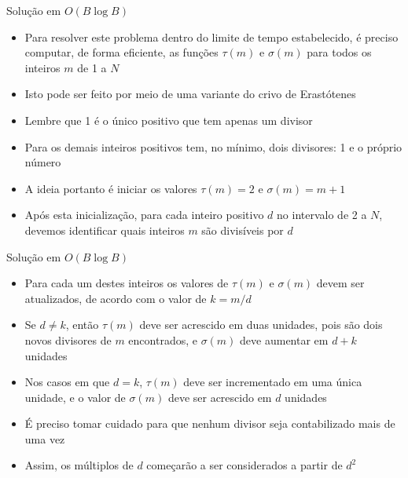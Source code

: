 \begin{frame}[fragile]{Solução em $O(B\log B)$}

    \begin{itemize}
        \item Para resolver este problema dentro do limite de tempo estabelecido, é preciso
            computar, de forma eficiente, as funções $\tau(m)$ e $\sigma(m)$ para todos 
            os inteiros $m$ de 1 a $N$

        \item Isto pode ser feito por meio de uma variante do crivo de Erastótenes

        \item Lembre que 1 é o único positivo que tem apenas um divisor

        \item Para os demais inteiros positivos tem, no mínimo, dois divisores: 1 e o próprio
            número

        \item A ideia portanto é iniciar os valores $\tau(m) = 2$ e $\sigma(m) = m + 1$

        \item Após esta inicialização, para cada inteiro positivo $d$ no intervalo de 2 a $N$,
            devemos identificar quais inteiros $m$ são divisíveis por $d$
    \end{itemize}

\end{frame}

\begin{frame}[fragile]{Solução em $O(B\log B)$}

    \begin{itemize}
        \item Para cada um destes inteiros os valores de $\tau(m)$ e $\sigma(m)$ devem ser 
            atualizados, de acordo com o valor de $k = m/d$

        \item Se $d\neq k$, então $\tau(m)$ deve ser acrescido em duas unidades, pois são
            dois novos divisores de $m$ encontrados, e $\sigma(m)$ deve aumentar em $d + k$
            unidades

        \item Nos casos em que $d = k$, $\tau(m)$ deve ser incrementado em uma única unidade,
            e o valor de $\sigma(m)$ deve ser acrescido em $d$ unidades

        \item É preciso tomar cuidado para que nenhum divisor seja contabilizado mais de uma 
            vez

        \item Assim, os múltiplos de $d$ começarão a ser considerados a partir de $d^2$
    \end{itemize}

\end{frame}

